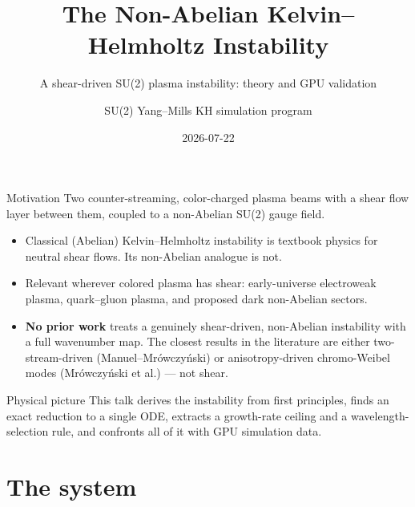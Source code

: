 \documentclass[aspectratio=169,11pt]{beamer}
\title{\textbf{The Non-Abelian Kelvin--Helmholtz Instability}}
\subtitle{A shear-driven SU(2) plasma instability: theory and GPU validation}
\author{SU(2) Yang--Mills KH simulation program}
\date{2026-07-22}
\newenvironment{physpicture}{\begin{exampleblock}{Physical picture}}{\end{exampleblock}}
\begin{document}
\begin{frame}
\titlepage
\end{frame}

\begin{frame}{Motivation}
Two counter-streaming, color-charged plasma beams with a shear flow layer between
them, coupled to a non-Abelian SU(2) gauge field.
\begin{itemize}
\item Classical (Abelian) Kelvin--Helmholtz instability is textbook physics for
neutral shear flows. Its non-Abelian analogue is not.
\item Relevant wherever colored plasma has shear: early-universe electroweak
plasma, quark--gluon plasma, and proposed dark non-Abelian sectors.
\item \textbf{No prior work} treats a genuinely shear-driven, non-Abelian
instability with a full wavenumber map. The closest results in the literature
are either two-stream-driven (Manuel--Mr\'owczy\'nski) or anisotropy-driven
chromo-Weibel modes (Mr\'owczy\'nski et al.) — not shear.
\end{itemize}
\begin{physpicture}
This talk derives the instability from first principles, finds an exact
reduction to a single ODE, extracts a growth-rate ceiling and a
wavelength-selection rule, and confronts all of it with GPU simulation data.
\end{physpicture}
\end{frame}

\section{The system}
\end{document}

